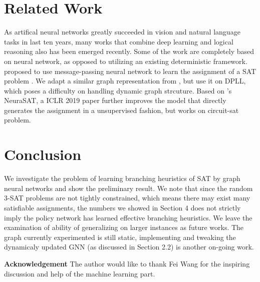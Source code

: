 \documentclass[sigplan,10pt]{acmart}\settopmatter{printfolios=true,printccs=false,printacmref=false}
\begin{document}
\section{Related Work}

As artifical neural networks greatly succeeded in vision and natural language tasks in last ten years,
many works that combine deep learning and logical reasoning also has been emerged recently.
Some of the work are completely based on neural network, as opposed to utilizing
an existing deterministic framework. \citeauthor{selsam2018learning} proposed to 
use message-passing neural network to learn the assignment of a SAT problem \cite{selsam2018learning}.
We adapt a similar graph representation from \citeauthor{selsam2018learning}, but use it 
on DPLL, which poses a difficulty on handling dynamic graph strcuture.
Based on \citeauthor{selsam2018learning}'s NeuraSAT, a ICLR 2019 paper
further improves the model that directly generates the assignment in a unsupervised fashion, 
but works on circuit-sat problem\cite{anonymous2019learning}.

\section{Conclusion}

We investigate the problem of learning branching heuristics of SAT by 
graph neural networks and show the preliminary result. 
We note that since the random 3-SAT problems are not tightly constrained,
which means there may exist many satisfiable assignments, the numbers we showed
in Section 4 does not strictly imply the policy network has learned effective
branching heuristics. We leave the examination of ability of generalizing
on larger instances as future works. The graph currently experimented is still 
static, implementing and tweaking the dynamicaly updated GNN (as discussed in 
Section 2.2) is another on-going work.

\textbf{Acknowledgement} The author would like to thank Fei Wang for the inspiring discussion and 
help of the machine learning part.

\clearpage{}







\end{document}
